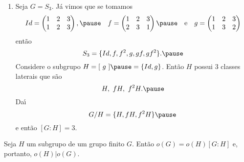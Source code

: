 \documentclass{beamer}
\begin{document}
    \begin{frame}
        \begin{exemplos}
            \begin{enumerate}[label=({\arabic*})]
                \conti

                \item Seja $G = S_3$. \pause J\'a vimos que se tomamos
                \[
                    Id = \begin{pmatrix}
                        1 & 2 & 3\\
                        1 & 2 & 3
                    \end{pmatrix}, \pause\quad
                    f = \begin{pmatrix}
                        1 & 2 & 3\\
                        2 & 3 & 1
                    \end{pmatrix} \pause \quad \mbox{e}\quad
                    g = \begin{pmatrix}
                        1 & 2 & 3\\
                        1 & 3 & 2
                    \end{pmatrix}
                \]
                ent\~ao
                \[
                    S_3 = \{Id, f, f^2, g, gf, gf^2\}. \pause
                \]
                Considere o subgrupo $H = [\ g\ ] \pause = \{Id, g\}$. Ent\~ao $H$ possui 3 classes laterais que s\~ao
                \[
                    H,\ fH,\ f^2H. \pause
                \]
                Da{\'\i}
                \[
                    G/H = \{H, fH, f^2H\} \pause
                \]
                e ent\~ao $[G : H] = 3$.
            \end{enumerate}
        \end{exemplos}
    \end{frame}

    \begin{frame}
        \begin{teorema}
            Seja $H$ um subgrupo \pause de um grupo finito $G$. \pause Ent\~ao $o(G) = o(H)[G:H]$ \pause e, portanto, $o(H) | o(G)$.
        \end{teorema}
    \end{frame}
\end{document}

